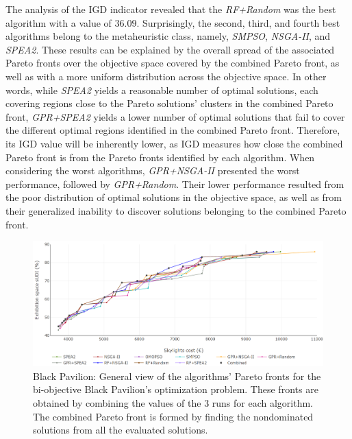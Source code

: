 The analysis of the \ac{IGD} indicator revealed that the \textit{RF+Random} was the best algorithm with a value of $36.09$. Surprisingly, the second, third, and fourth best algorithms belong to the metaheuristic class, namely, \textit{SMPSO}, \textit{\ac{NSGA-II}}, and \textit{\ac{SPEA2}}. These results can be explained by the overall spread of the associated Pareto fronts over the objective space covered by the combined Pareto front, as well as with a more uniform distribution across the objective space. In other words, while \textit{\ac{SPEA2}} yields a reasonable number of optimal solutions, each covering regions close to the Pareto solutions' clusters in the combined Pareto front, \textit{GPR+SPEA2} yields a lower number of optimal solutions that fail to cover the different optimal regions identified in the combined Pareto front. Therefore, its \ac{IGD} value will be inherently lower, as \ac{IGD} measures how close the combined Pareto front is from the Pareto fronts identified by each algorithm. When considering the worst algorithms, \textit{GPR+NSGA-II} presented the worst performance, followed by \textit{GPR+Random}. Their lower performance resulted from the poor distribution of optimal solutions in the objective space, as well as from their generalized inability to discover solutions belonging to the combined Pareto front. 

\begin{figure}[htbp]
	\centering
	\includegraphics[width=\textwidth]{Images/Evaluation/BlackPavilion/All_Algorithms_all_runs-2019-04-16.png}
	\caption[Black Pavilion: General view of the Pareto fronts retrieved by 10 algorithms]{Black Pavilion: General view of the algorithms' Pareto fronts for the bi-objective Black Pavilion's optimization problem. These fronts are obtained by combining the values of the 3 runs for each algorithm. The combined Pareto front is formed by finding the nondominated solutions from all the evaluated solutions.}
	\label{fig:blackpavilionallruns}
\end{figure}

